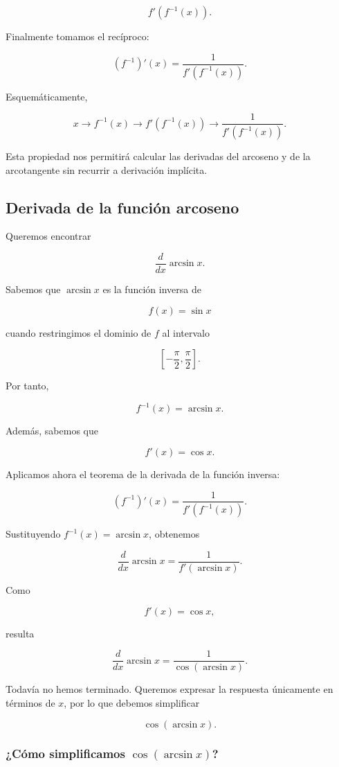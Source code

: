 \documentclass[12pt]{article}
\theoremstyle{definition}
\theoremstyle{remark}
\begin{document}
\[
f'(f^{-1}(x)).
\]

Finalmente tomamos el recíproco:

\[
(f^{-1})'(x)
=
\frac{1}{f'(f^{-1}(x))}.
\]

Esquemáticamente,

\[
\boxed{
x
\longrightarrow
f^{-1}(x)
\longrightarrow
f'(f^{-1}(x))
\longrightarrow
\frac{1}{f'(f^{-1}(x))}.
}
\]

Esta propiedad nos permitirá calcular las derivadas del arcoseno y de
la arcotangente sin recurrir a derivación implícita.

\subsection*{Derivada de la función arcoseno}

Queremos encontrar

\[
\frac{d}{dx}\arcsin x.
\]

Sabemos que $\arcsin x$ es la función inversa de

\[
f(x)=\sin x
\]

cuando restringimos el dominio de $f$ al intervalo

\[
\left[-\frac{\pi}{2},\frac{\pi}{2}\right].
\]

Por tanto,

\[
f^{-1}(x)=\arcsin x.
\]

Además, sabemos que

\[
f'(x)=\cos x.
\]

Aplicamos ahora el teorema de la derivada de la función inversa:

\[
(f^{-1})'(x)
=
\frac{1}{f'(f^{-1}(x))}.
\]

Sustituyendo $f^{-1}(x)=\arcsin x$, obtenemos

\[
\frac{d}{dx}\arcsin x
=
\frac{1}{f'(\arcsin x)}.
\]

Como

\[
f'(x)=\cos x,
\]

resulta

\[
\boxed{
\frac{d}{dx}\arcsin x
=
\frac{1}{\cos(\arcsin x)}.
}
\]

Todavía no hemos terminado. Queremos expresar la respuesta únicamente
en términos de $x$, por lo que debemos simplificar

\[
\cos(\arcsin x).
\]

\subsubsection*{¿Cómo simplificamos $\cos(\arcsin x)$?}
\end{document}
